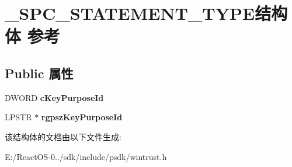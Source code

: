 \hypertarget{struct___s_p_c___s_t_a_t_e_m_e_n_t___t_y_p_e}{}\section{\+\_\+\+S\+P\+C\+\_\+\+S\+T\+A\+T\+E\+M\+E\+N\+T\+\_\+\+T\+Y\+P\+E结构体 参考}
\label{struct___s_p_c___s_t_a_t_e_m_e_n_t___t_y_p_e}
\subsection*{Public 属性}
\begin{DoxyCompactItemize}
\item 
\mbox{\label{struct___s_p_c___s_t_a_t_e_m_e_n_t___t_y_p_e_a274e669e0c0448228ae07ec8ee1bf447}} 
D\+W\+O\+RD {\bfseries c\+Key\+Purpose\+Id}
\item 
\mbox{\label{struct___s_p_c___s_t_a_t_e_m_e_n_t___t_y_p_e_ad081a54a11518a8f220deecc17c56b1e}} 
L\+P\+S\+TR $\ast$ {\bfseries rgpsz\+Key\+Purpose\+Id}
\end{DoxyCompactItemize}


该结构体的文档由以下文件生成\+:\begin{DoxyCompactItemize}
\item 
E\+:/\+React\+O\+S-\/0../sdk/include/psdk/wintrust.\+h\end{DoxyCompactItemize}
